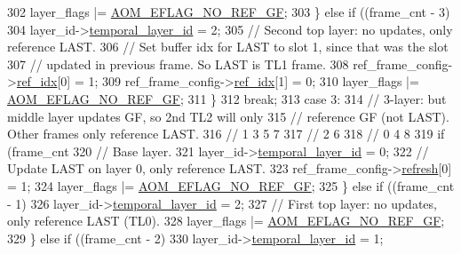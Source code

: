 \begin{DoxyCodeInclude}
{{{{{{{{{302         layer\_flags |= \hyperlink{group__aom__encoder_gaaef6fe76991abf87edd2f296eee999f8}{AOM\_EFLAG\_NO\_REF\_GF};
303       \} \textcolor{keywordflow}{else} \textcolor{keywordflow}{if} ((frame\_cnt - 3) %
304         layer\_id->\hyperlink{structaom__svc__layer__id_a9a28c1b126e8d1fdda6e1d881afb66fb}{temporal\_layer\_id} = 2;
305         \textcolor{comment}{// Second top layer: no updates, only reference LAST.}
306         \textcolor{comment}{// Set buffer idx for LAST to slot 1, since that was the slot}
307         \textcolor{comment}{// updated in previous frame. So LAST is TL1 frame.}
308         ref\_frame\_config->\hyperlink{structaom__svc__ref__frame__config_ae6f0dece96f18986127eb6c2ee66c210}{ref\_idx}[0] = 1;
309         ref\_frame\_config->\hyperlink{structaom__svc__ref__frame__config_ae6f0dece96f18986127eb6c2ee66c210}{ref\_idx}[1] = 0;
310         layer\_flags |= \hyperlink{group__aom__encoder_gaaef6fe76991abf87edd2f296eee999f8}{AOM\_EFLAG\_NO\_REF\_GF};
311       \}
312       \textcolor{keywordflow}{break};
313     \textcolor{keywordflow}{case} 3:
314       \textcolor{comment}{// 3-layer: but middle layer updates GF, so 2nd TL2 will only}
315       \textcolor{comment}{// reference GF (not LAST). Other frames only reference LAST.}
316       \textcolor{comment}{//   1    3   5    7}
317       \textcolor{comment}{//     2        6}
318       \textcolor{comment}{// 0        4        8}
319       \textcolor{keywordflow}{if} (frame\_cnt %
320         \textcolor{comment}{// Base layer.}
321         layer\_id->\hyperlink{structaom__svc__layer__id_a9a28c1b126e8d1fdda6e1d881afb66fb}{temporal\_layer\_id} = 0;
322         \textcolor{comment}{// Update LAST on layer 0, only reference LAST.}
323         ref\_frame\_config->\hyperlink{structaom__svc__ref__frame__config_ab2a4596eadeaf5b7730588367918beda}{refresh}[0] = 1;
324         layer\_flags |= \hyperlink{group__aom__encoder_gaaef6fe76991abf87edd2f296eee999f8}{AOM\_EFLAG\_NO\_REF\_GF};
325       \} \textcolor{keywordflow}{else} \textcolor{keywordflow}{if} ((frame\_cnt - 1) %
326         layer\_id->\hyperlink{structaom__svc__layer__id_a9a28c1b126e8d1fdda6e1d881afb66fb}{temporal\_layer\_id} = 2;
327         \textcolor{comment}{// First top layer: no updates, only reference LAST (TL0).}
328         layer\_flags |= \hyperlink{group__aom__encoder_gaaef6fe76991abf87edd2f296eee999f8}{AOM\_EFLAG\_NO\_REF\_GF};
329       \} \textcolor{keywordflow}{else} \textcolor{keywordflow}{if} ((frame\_cnt - 2) %
330         layer\_id->\hyperlink{structaom__svc__layer__id_a9a28c1b126e8d1fdda6e1d881afb66fb}{temporal\_layer\_id} = 1;
}}}}}}}}}
\end{DoxyCodeInclude}
